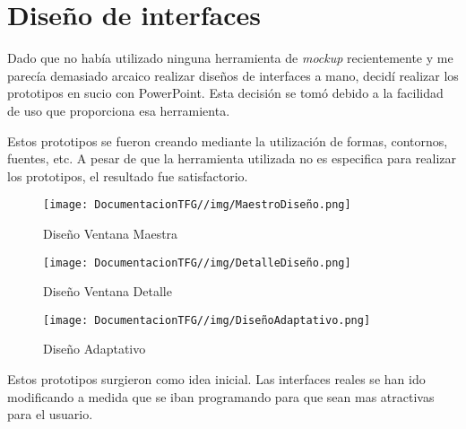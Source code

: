 \section{Diseño de interfaces}
Dado que no había utilizado ninguna herramienta de \textit{mockup} recientemente y me parecía demasiado arcaico realizar diseños de interfaces a mano, decidí realizar los prototipos en sucio con PowerPoint. Esta decisión se tomó debido a la facilidad de uso que proporciona esa herramienta. 

Estos prototipos se fueron creando mediante la utilización de formas, contornos, fuentes, etc. A pesar de que la herramienta utilizada no es especifica para realizar los prototipos, el resultado fue satisfactorio.

\begin{figure}[H]
    \centering
    \texttt{[image: DocumentacionTFG//img/MaestroDiseño.png]}
    \caption{Diseño Ventana Maestra}
\end{figure}

\begin{figure}[H]
    \centering
    \texttt{[image: DocumentacionTFG//img/DetalleDiseño.png]}
    \caption{Diseño Ventana Detalle}
\end{figure}

\begin{figure}[H]
    \centering
    \texttt{[image: DocumentacionTFG//img/DiseñoAdaptativo.png]}
    \caption{Diseño Adaptativo}
\end{figure}

Estos prototipos surgieron como idea inicial. Las interfaces reales se han ido modificando a medida que se iban programando para que sean mas atractivas para el usuario.
